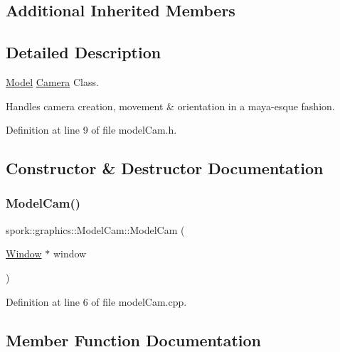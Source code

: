 \subsection*{Additional Inherited Members}


\subsection{Detailed Description}
\hyperlink{classspork_1_1graphics_1_1_model}{Model} \hyperlink{classspork_1_1graphics_1_1_camera}{Camera} Class. 

Handles camera creation, movement \& orientation in a maya-\/esque fashion. 

Definition at line 9 of file model\+Cam.\+h.



\subsection{Constructor \& Destructor Documentation}
\mbox{\label{classspork_1_1graphics_1_1_model_cam_a54380c21aa0b4b738cfa1d00e37ae477}} 
\subsubsection{\texorpdfstring{Model\+Cam()}{ModelCam()}}
{\footnotesize\ttfamily spork\+::graphics\+::\+Model\+Cam\+::\+Model\+Cam (\begin{DoxyParamCaption}\item[{\hyperlink{classspork_1_1graphics_1_1_window}{Window} $\ast$}]{window }\end{DoxyParamCaption})}



Definition at line 6 of file model\+Cam.\+cpp.



\subsection{Member Function Documentation}
\mbox{\label{classspork_1_1graphics_1_1_model_cam_ade4df0e81cc325af221081634384783d}} 
